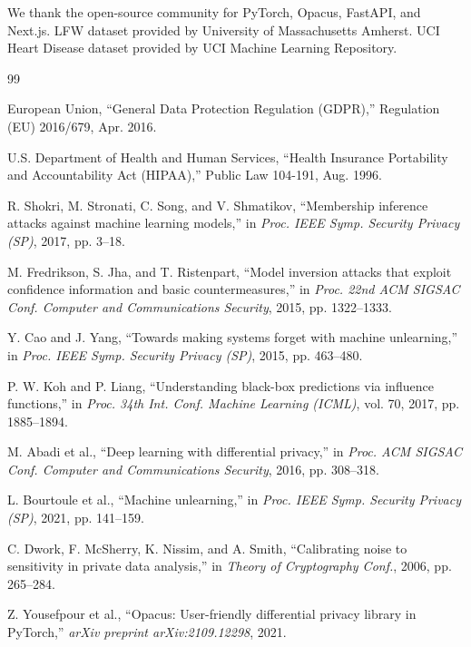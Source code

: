 \documentclass[conference]{IEEEtran}
\begin{document}
We thank the open-source community for PyTorch, Opacus, FastAPI, and Next.js. LFW dataset provided by University of Massachusetts Amherst. UCI Heart Disease dataset provided by UCI Machine Learning Repository.

\begin{thebibliography}{99}

European Union, ``General Data Protection Regulation (GDPR),'' Regulation (EU) 2016/679, Apr. 2016.

U.S. Department of Health and Human Services, ``Health Insurance Portability and Accountability Act (HIPAA),'' Public Law 104-191, Aug. 1996.

R. Shokri, M. Stronati, C. Song, and V. Shmatikov, ``Membership inference attacks against machine learning models,'' in \textit{Proc. IEEE Symp. Security Privacy (SP)}, 2017, pp. 3–18.

M. Fredrikson, S. Jha, and T. Ristenpart, ``Model inversion attacks that exploit confidence information and basic countermeasures,'' in \textit{Proc. 22nd ACM SIGSAC Conf. Computer and Communications Security}, 2015, pp. 1322–1333.

Y. Cao and J. Yang, ``Towards making systems forget with machine unlearning,'' in \textit{Proc. IEEE Symp. Security Privacy (SP)}, 2015, pp. 463–480.

P. W. Koh and P. Liang, ``Understanding black-box predictions via influence functions,'' in \textit{Proc. 34th Int. Conf. Machine Learning (ICML)}, vol. 70, 2017, pp. 1885–1894.

M. Abadi et al., ``Deep learning with differential privacy,'' in \textit{Proc. ACM SIGSAC Conf. Computer and Communications Security}, 2016, pp. 308–318.

L. Bourtoule et al., ``Machine unlearning,'' in \textit{Proc. IEEE Symp. Security Privacy (SP)}, 2021, pp. 141–159.

C. Dwork, F. McSherry, K. Nissim, and A. Smith, ``Calibrating noise to sensitivity in private data analysis,'' in \textit{Theory of Cryptography Conf.}, 2006, pp. 265–284.

Z. Yousefpour et al., ``Opacus: User-friendly differential privacy library in PyTorch,'' \textit{arXiv preprint arXiv:2109.12298}, 2021.


\end{thebibliography}
\end{document}
